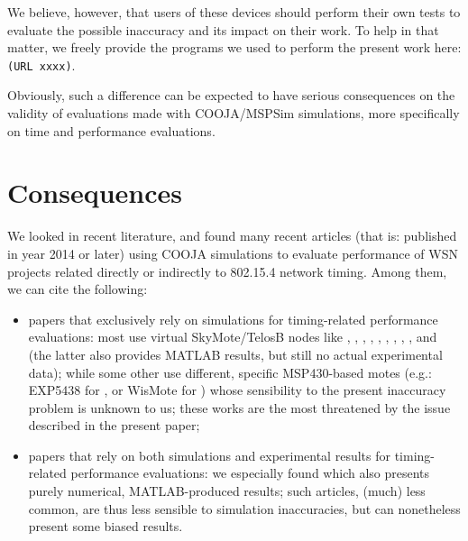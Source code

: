 \documentclass[a4paper,10pt]{article}
\begin{document}
We believe, however, that users of these devices should perform their
own tests to evaluate the possible inaccuracy and its impact on their work.
To help in that matter, we freely provide the programs we used to perform the
present work here:\\
\texttt{(URL xxxx)}.

Obviously, such a difference can be expected to have serious consequences
on the validity of evaluations made with COOJA/MSPSim simulations,
more specifically on time and performance evaluations.


\section{Consequences}

We looked in recent literature, and found many recent articles (that is:
published in year 2014 or later) using COOJA simulations to evaluate
performance of WSN projects related directly or indirectly to 802.15.4
network timing. Among them, we can cite the following:
\begin{itemize}
\item papers that exclusively rely on simulations for timing-related
performance evaluations: most use virtual SkyMote/TelosB nodes like
\cite{Constrain-Routing-Trees-2014}, \cite{Contiki-RPL-Eval-2014},
\cite{Co-RPL-2014}, \cite{DINAS-2014},
\cite{Efficient-Distrib-Svc-Discovery-2014},
\cite{IETF-Routing-WSN-2014},
\cite{TinySDN-2014}, \cite{Trickle-L2-2014},
\cite{Visual-Sensor-Networks-2014},
and \cite{RPL-GreenHouse-Convgc-Time-2014} (the latter also provides
MATLAB results, but still no actual experimental data);
while some other use different, specific MSP430-based motes
(e.g.: EXP5438 for \cite{Key-Mgmt-2015}, or WisMote for
\cite{Lightweight-Multicast-Forwarding-2014}) whose sensibility
to the present inaccuracy problem is unknown to us;
these works are the most threatened by the issue described
in the present paper;
\item papers that rely on both simulations and experimental results
for timing-related performance evaluations: we especially found
\cite{Probing-Mech-wu-2015} which also presents purely numerical,
MATLAB-produced results; such articles, (much) less common, are thus
less sensible to simulation inaccuracies, but can nonetheless present
some biased results.
\end{itemize}
\end{document}
